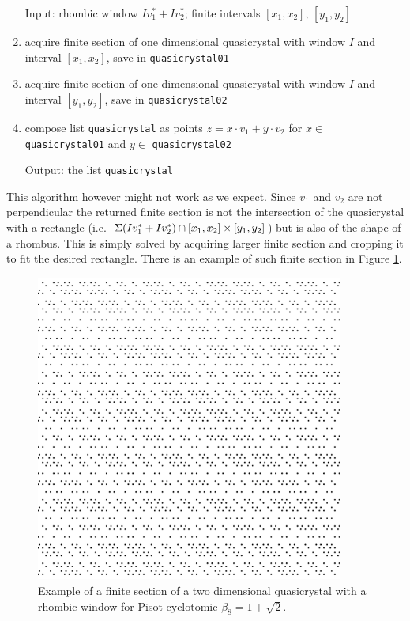 \documentclass[text.tex]{subfiles}
\begin{document}
\begin{enumerate}
\item[Input:] rhombic window $Iv_1^\ast+Iv_2^\ast$; finite intervals $[x_1,x_2]$, $[y_1,y_2]$
\item acquire finite section of one dimensional quasicrystal with window $I$ and interval $[x_1,x_2]$, save in \texttt{quasicrystal01}
\item acquire finite section of one dimensional quasicrystal with window $I$ and interval $[y_1,y_2]$, save in \texttt{quasicrystal02}
\item compose list \texttt{quasicrystal} as points $z=x\cdot v_1+y\cdot v_2$ for $x\in$ \texttt{quasicrystal01} and $y\in$ \texttt{quasicrystal02}
\item[Output:] the list \texttt{quasicrystal}
\end{enumerate}

This algorithm however might not work as we expect. Since $v_1$ and $v_2$ are not perpendicular the returned finite section is not the intersection of the quasicrystal with a rectangle (i.e.\ $\Sigma(Iv_1^\ast+Iv_2^\ast)\cap[x_1,x_2]\times[y_1,y_2]$) but is also of the shape of a rhombus. This is simply solved by acquiring larger finite section and cropping it to fit the desired rectangle. There is an example of such finite section in Figure \ref{fig_quasicrystalExampleRhombus}. 

\begin{figure}[h!]
\centering
\includegraphics[width=0.9\textwidth]{img/2D/rhombus}
\caption{Example of a finite section of a two dimensional quasicrystal with a rhombic window for Pisot-cyclotomic $\beta_8=1+\sqrt{2}$.}
\label{fig_quasicrystalExampleRhombus}
\end{figure}
\end{document}
